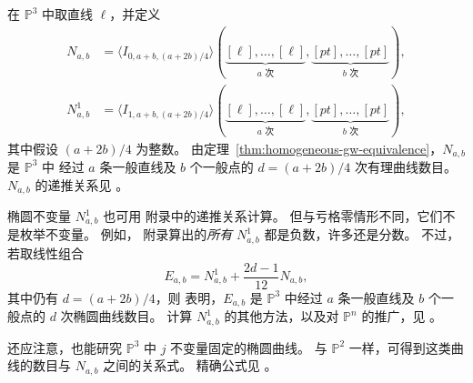 \begin{example}\label{ex:space-genus-one}
在 $\mathbb P^3$ 中取直线 $\ell$，并定义
\[
\begin{aligned}
N_{a,b}&=\langle I_{0,a+b,(a+2b)/4}\rangle
(\underbrace{[\ell],\ldots,[\ell]}_{a\text{ 次}},\underbrace{[pt],\ldots,[pt]}_{b\text{ 次}}),\\
N_{a,b}^1&=\langle I_{1,a+b,(a+2b)/4}\rangle
(\underbrace{[\ell],\ldots,[\ell]}_{a\text{ 次}},\underbrace{[pt],\ldots,[pt]}_{b\text{ 次}}),
\end{aligned}
\]
其中假设 $(a+2b)/4$ 为整数。
由定理~\ref{thm:homogeneous-gw-equivalence}，$N_{a,b}$ 是 $\mathbb P^3$ 中
经过 $a$ 条一般直线及 $b$ 个一般点的 $d=(a+2b)/4$ 次有理曲线数目。
$N_{a,b}$ 的递推关系见 。

椭圆不变量 $N_{a,b}^1$ 也可用  附录中的递推关系计算。
但与亏格零情形不同，它们不是枚举不变量。
例如， 附录算出的\emph{所有} $N_{a,b}^1$ 都是负数，许多还是分数。
不过，若取线性组合
\[
E_{a,b}=N_{a,b}^1+\frac{2d-1}{12}N_{a,b},
\]
其中仍有 $d=(a+2b)/4$，则  表明，$E_{a,b}$ 是
$\mathbb P^3$ 中经过 $a$ 条一般直线及 $b$ 个一般点的 $d$ 次椭圆曲线数目。
计算 $N_{a,b}^1$ 的其他方法，以及对 $\mathbb P^n$ 的推广，见 。

还应注意，也能研究 $\mathbb P^3$ 中 $j$ 不变量固定的椭圆曲线。
与 $\mathbb P^2$ 一样，可得到这类曲线的数目与 $N_{a,b}$ 之间的关系式。
精确公式见 。
\end{example}
